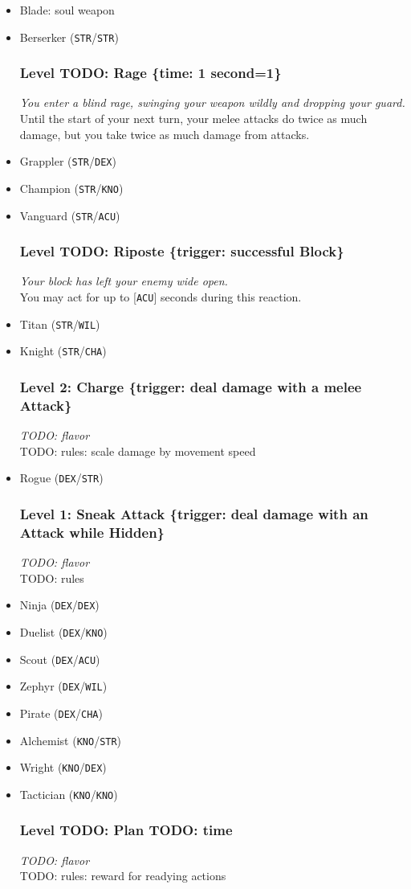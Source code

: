 \documentclass[12pt]{article}
\newcommand{\STR}{\texttt{STR}}
\newcommand{\DEX}{\texttt{DEX}}
\newcommand{\KNO}{\texttt{KNO}}
\newcommand{\ACU}{\texttt{ACU}}
\newcommand{\WIL}{\texttt{WIL}}
\newcommand{\CHA}{\texttt{CHA}}
\newcommand{\TIME}[1]{\{time: #1 second\if1=#1{}\else{s}\fi\}}
\newcommand{\TRIG}[1]{\{trigger: #1\}}
\newcommand{\Skill}[5]{\subsubsection{Level #1: #2 #3}\textit{#4}\\[1mm]#5}
\begin{document}
\begin{itemize}
\item Blade: soul weapon
\item Berserker (\STR/\STR)

\Skill{TODO}{Rage}{\TIME{1}}
{You enter a blind rage, swinging your weapon wildly and dropping your guard.}
{Until the start of your next turn, your melee attacks do twice as much damage, but you take twice as much damage from attacks.}

\item Grappler (\STR/\DEX)
\item Champion (\STR/\KNO)
\item Vanguard (\STR/\ACU)

\Skill{TODO}{Riposte}{\TRIG{successful Block}}
{Your block has left your enemy wide open.}
{You may act for up to [\ACU] seconds during this reaction.}

\item Titan (\STR/\WIL)
\item Knight (\STR/\CHA)

\Skill{2}{Charge}{\TRIG{deal damage with a melee Attack}}
{TODO: flavor}
{TODO: rules: scale damage by movement speed}

\item Rogue (\DEX/\STR)

\Skill{1}{Sneak Attack}{\TRIG{deal damage with an Attack while Hidden}}
{TODO: flavor}
{TODO: rules}

\item Ninja (\DEX/\DEX)
\item Duelist (\DEX/\KNO)
\item Scout (\DEX/\ACU)
\item Zephyr (\DEX/\WIL)
\item Pirate (\DEX/\CHA)
\item Alchemist (\KNO/\STR)
\item Wright (\KNO/\DEX)
\item Tactician (\KNO/\KNO)

\Skill{TODO}{Plan}{TODO: time}
{TODO: flavor}
{TODO: rules: reward for readying actions}


\end{itemize}
\end{document}
